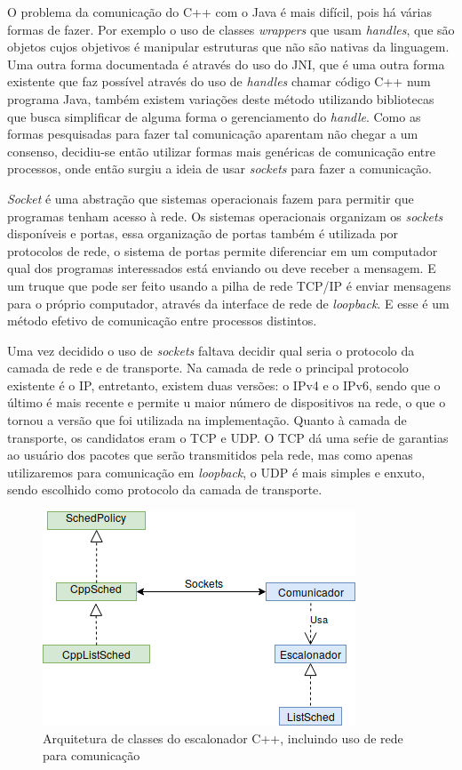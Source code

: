 O problema da comunicação do C++ com o Java é mais difícil, pois há várias formas de fazer. Por exemplo o uso de classes \textit{wrappers} que usam \textit{handles}, que são objetos cujos objetivos é manipular estruturas que não são nativas da linguagem\cite{CppJavaHandle}. Uma outra forma documentada é através do uso do \acrfull{JNI}, que é uma outra forma existente que faz possível através do uso de \textit{handles} chamar código C++ num programa Java\cite{CppJavaJNI}, também existem variações deste método utilizando bibliotecas que busca simplificar de alguma forma o gerenciamento do \textit{handle}. Como as formas pesquisadas para fazer tal comunicação aparentam não chegar a um consenso, decidiu-se então utilizar formas mais genéricas de comunicação entre processos, onde então surgiu a ideia de usar \textit{sockets} para fazer a comunicação.

\textit{Socket} é uma abstração que sistemas operacionais fazem para permitir que programas tenham acesso à rede. Os sistemas operacionais organizam os \textit{sockets} disponíveis e portas, essa organização de portas também é utilizada por protocolos de rede, o sistema de portas permite diferenciar em um computador qual dos programas interessados está enviando ou deve receber a mensagem. E um truque que pode ser feito usando a pilha de rede \acrshort{TCP/IP} é enviar mensagens para o próprio computador, através da interface de rede de \textit{loopback}. E esse é um método efetivo de comunicação entre processos distintos.

Uma vez decidido o uso de \textit{sockets} faltava decidir qual seria o protocolo da camada de rede e de transporte. Na camada de rede o principal protocolo existente é o \acrfull{IP}, entretanto, existem duas versões: o IPv4 e o IPv6, sendo que o último é mais recente e permite u maior número de dispositivos na rede, o que o tornou a versão que foi utilizada na implementação. Quanto à camada de transporte, os candidatos eram o \acrshort{TCP} e \acrshort{UDP}. O \acrshort{TCP} dá uma seŕie de garantias ao usuário dos pacotes que serão transmitidos pela rede, mas como apenas utilizaremos para comunicação em \textit{loopback}, o \acrshort{UDP} é mais simples e enxuto, sendo escolhido como protocolo da camada de transporte.

\begin{figure}[htbp]
	\centerline{\includegraphics[scale=0.7]{img/Proposta.png}}
	\caption{Arquitetura de classes do escalonador C++, incluindo uso de rede para comunicação}
	\label{ArquiteturaProposta}
\end{figure}



